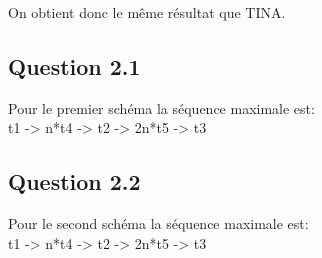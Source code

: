 On obtient donc le même résultat que TINA.


\subsection{Question 2.1}
Pour le premier schéma la séquence maximale est:\\
t1 -> n*t4 -> t2 -> 2n*t5 -> t3 

\subsection{Question 2.2}
Pour le second schéma la séquence maximale est:\\
t1 -> n*t4 -> t2 -> 2n*t5 -> t3 